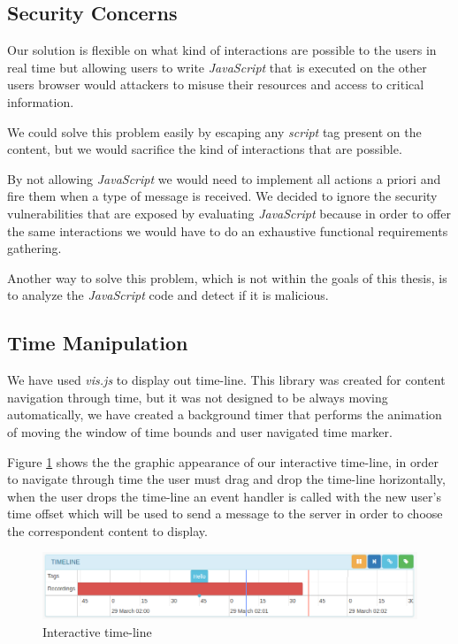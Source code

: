 	\subsection{Security Concerns}

	Our solution is flexible on what kind of interactions are possible to the users in real time but allowing users to write \emph{JavaScript} that is executed on the other users browser would attackers to misuse their resources and access to critical information.

	We could solve this problem easily by escaping any \emph{script} tag present on the content, but we would sacrifice the kind of interactions that are possible. 

	By not allowing \emph{JavaScript} we would need to implement all actions a priori and fire them when a type of message is received. We decided to ignore the security vulnerabilities that are exposed by evaluating \emph{JavaScript} because in order to offer the same interactions we would have to do an exhaustive functional requirements gathering.

	Another way to solve this problem, which is not within the goals of this thesis, is to analyze the \emph{JavaScript} code and detect if it is malicious.

	\subsection{Time Manipulation}

	We have used \emph{vis.js} to display out time-line. This library was created for content navigation through time, but it was not designed to be always moving automatically, we have created a background timer that performs the animation of moving the window of time bounds and user navigated time marker.

	Figure \ref{fig:timeline} shows the the graphic appearance of our interactive time-line, in order to navigate through time the user must drag and drop the time-line horizontally, when the user drops the time-line an event handler is called with the new user's time offset which will be used to send a message to the server in order to choose the correspondent content to display. 

	\begin{figure}[!htb]
		\centering
		\includegraphics[width=\textwidth]{figures/timeline.png}
		\caption{Interactive time-line}
		\label{fig:timeline}
	\end{figure}

